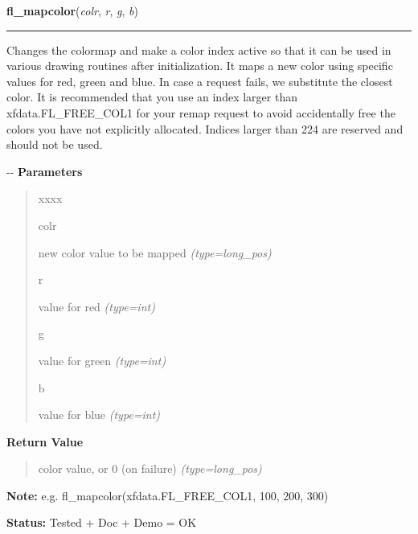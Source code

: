     \label{xformslib:flbasic:fl_mapcolor}

    \vspace{0.5ex}

\hspace{.8\funcindent}\begin{boxedminipage}{\funcwidth}

    \raggedright \textbf{fl\_mapcolor}(\textit{colr}, \textit{r}, \textit{g}, \textit{b})

    \vspace{-1.5ex}

    \rule{\textwidth}{0.5\fboxrule}
\setlength{\parskip}{2ex}

Changes the colormap and make a color index active so that it can be
used in various drawing routines after initialization. It maps a new color
using specific values for red, green and blue. In case a request fails, we
substitute the closest color. It is recommended that you use an index
larger than xfdata.FL\_FREE\_COL1 for your remap request to avoid
accidentally free the colors you have not explicitly allocated. Indices
larger than 224 are reserved and should not be used.

-{}-
\setlength{\parskip}{1ex}
      \textbf{Parameters}
      \vspace{-1ex}

      \begin{quote}
        \begin{Ventry}{xxxx}

          \item[colr]


new color value to be mapped
            {\it (type=long\_pos)}

          \item[r]


value for red
            {\it (type=int)}

          \item[g]


value for green
            {\it (type=int)}

          \item[b]


value for blue
            {\it (type=int)}

        \end{Ventry}

      \end{quote}

      \textbf{Return Value}
    \vspace{-1ex}

      \begin{quote}

color value, or 0 (on failure)
      {\it (type=long\_pos)}

      \end{quote}

\textbf{Note:} 
e.g. fl\_mapcolor(xfdata.FL\_FREE\_COL1, 100, 200, 300)


\textbf{Status:} 
Tested + Doc + Demo = OK


    \end{boxedminipage}

